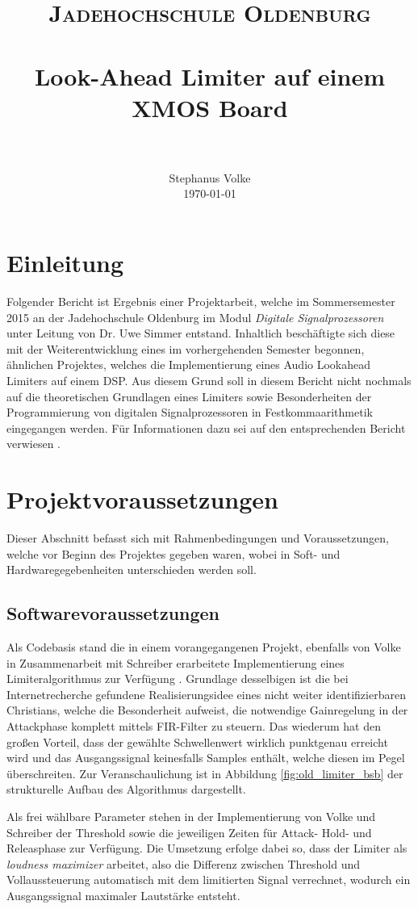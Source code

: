 \documentclass[paper=a4, fontsize=12pt]{scrartcl}
\title{
		\usefont{OT1}{bch}{b}{n}
		\normalfont \normalsize \textsc{Jadehochschule Oldenburg} \\ [25pt]
		\horrule{0.5pt} \\[0.4cm]
		\huge Look-Ahead Limiter auf einem XMOS Board \\
		\horrule{2pt} \\[0.5cm]
}
\author{
		\normalfont 								\normalsize
        Stephanus Volke\\[-3pt]		\normalsize
        \today
}
\date{}
\numberwithin{equation}{section}		%
\numberwithin{figure}{section}			%
\numberwithin{table}{section}				%
\begin{document}
\maketitle
\newpage
\tableofcontents
\newpage
\section{Einleitung}
Folgender Bericht ist Ergebnis einer Projektarbeit, welche im Sommersemester 2015 an der Jadehochschule Oldenburg im Modul \textit{Digitale Signalprozessoren} unter Leitung von Dr. Uwe Simmer entstand. Inhaltlich beschäftigte sich diese mit der Weiterentwicklung eines im vorhergehenden Semester begonnen, ähnlichen Projektes, welches die Implementierung eines Audio Lookahead Limiters auf einem DSP. Aus diesem Grund soll in diesem Bericht nicht nochmals auf die theoretischen Grundlagen eines Limiters sowie Besonderheiten der Programmierung von digitalen Signalprozessoren in Festkommaarithmetik eingegangen werden. Für Informationen dazu sei auf den entsprechenden Bericht verwiesen \cite{VS15}.


\section{Projektvoraussetzungen}

Dieser Abschnitt befasst sich mit Rahmenbedingungen und Voraussetzungen, welche vor Beginn des Projektes gegeben waren, wobei in Soft- und Hardwaregegebenheiten unterschieden werden soll.

\subsection{Softwarevoraussetzungen}
Als Codebasis stand die in einem vorangegangenen Projekt, ebenfalls von Volke in Zusammenarbeit mit Schreiber erarbeitete Implementierung eines Limiteralgorithmus zur Verfügung \cite{CR00}. Grundlage desselbigen ist die bei Internetrecherche gefundene Realisierungsidee eines nicht weiter identifizierbaren Christians, welche die Besonderheit aufweist, die notwendige Gainregelung in der Attackphase komplett mittels FIR-Filter zu steuern. Das wiederum hat den großen Vorteil, dass der gewählte Schwellenwert wirklich punktgenau erreicht wird und das Ausgangssignal keinesfalls Samples enthält, welche diesen im Pegel überschreiten. Zur Veranschaulichung ist in Abbildung \ref{fig:old_limiter_bsb} der strukturelle Aufbau des Algorithmus dargestellt.


Als frei wählbare Parameter stehen in der Implementierung von Volke und Schreiber der Threshold sowie die jeweiligen Zeiten für Attack- Hold- und Releasphase zur Verfügung. Die Umsetzung erfolge dabei so, dass der Limiter als \textit{loudness maximizer} arbeitet, also die Differenz zwischen Threshold und Vollaussteuerung automatisch mit dem limitierten Signal verrechnet, wodurch ein Ausgangssignal maximaler Lautstärke entsteht.
\end{document}
